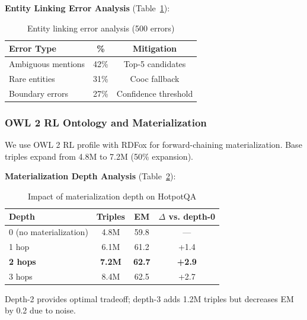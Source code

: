 \documentclass[10pt,twocolumn]{article}
\begin{document}
\textbf{Entity Linking Error Analysis} (Table~\ref{tab:entity_error}):

\begin{table}[h]
\centering
\caption{Entity linking error analysis (500 errors)}
\label{tab:entity_error}
\small
\begin{tabular}{@{}lcc@{}}
\toprule
\textbf{Error Type} & \textbf{\%} & \textbf{Mitigation} \\
\midrule
Ambiguous mentions & 42\% & Top-5 candidates \\
Rare entities & 31\% & Cooc fallback \\
Boundary errors & 27\% & Confidence threshold \\
\bottomrule
\end{tabular}
\end{table}


\subsubsection{OWL 2 RL Ontology and Materialization}
\label{sec:owl2rl}

We use OWL 2 RL profile \cite{motik2012owl2} with RDFox \cite{rdfox2023} for forward-chaining materialization. Base triples expand from 4.8M to 7.2M (50\% expansion).

\textbf{Materialization Depth Analysis} (Table~\ref{tab:materialization_depth}):

\begin{table}[h]
\centering
\caption{Impact of materialization depth on HotpotQA}
\label{tab:materialization_depth}
\small
\begin{tabular}{@{}lccc@{}}
\toprule
\textbf{Depth} & \textbf{Triples} & \textbf{EM} & \textbf{$\Delta$ vs. depth-0} \\
\midrule
0 (no materialization) & 4.8M & 59.8 & --- \\
1 hop & 6.1M & 61.2 & +1.4 \\
\textbf{2 hops} & \textbf{7.2M} & \textbf{62.7} & \textbf{+2.9} \\
3 hops & 8.4M & 62.5 & +2.7 \\
\bottomrule
\end{tabular}
\end{table}

Depth-2 provides optimal tradeoff; depth-3 adds 1.2M triples but decreases EM by 0.2 due to noise.


\end{document}
